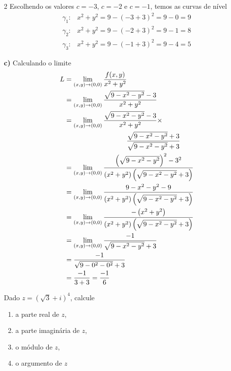 \documentclass[a4paper,12pt,fleqn]{article}
\begin{document}
\begin{answer}
\begin{multicols}{2}
    Escolhendo os valores $c=-3$, $c=-2$ e $c=-1$, temos as curvas de nível
    \begin{align*}
      \gamma_1\colon & x^2 + y^2 = 9 - (-3 + 3)^2 = 9 - 0 = 9 \\
      \gamma_2\colon & x^2 + y^2 = 9 - (-2 + 3)^2 = 9 - 1 = 8 \\
      \gamma_3\colon & x^2 + y^2 = 9 - (-1 + 3)^2 = 9 - 4 = 5
    \end{align*}

    \vspace{\baselineskip}
    \textbf{c)\;}
    Calculando o limite
    \setlength{\jot}{12pt}
    \setlength{\mathindent}{0cm}
    \begin{align*}
      L
      & = \lim_{(x, y)\to(0, 0)} \frac{f(x, y)}{x^2+y^2} \\
      & = \lim_{(x, y)\to(0, 0)} \frac{\sqrt{9-x^2-y^2}-3}{x^2+y^2} \\
      & = \lim_{(x, y)\to(0, 0)} \frac{\sqrt{9-x^2-y^2}-3}{x^2+y^2} \times \\
      & \hspace{32mm}            \frac{\sqrt{9-x^2-y^2}+3}{\sqrt{9-x^2-y^2}+3} \\
      & = \lim_{(x, y)\to(0, 0)} \frac{\left(\sqrt{9-x^2-y^2}\right)^2-3^2}
      {\left(x^2+y^2\right)\left(\sqrt{9-x^2-y^2}+3\right)} \\
      & = \lim_{(x, y)\to(0, 0)} \frac{9-x^2-y^2-9}{\left(x^2+y^2\right)\left(\sqrt{9-x^2-y^2}+3\right)} \\
      & = \lim_{(x, y)\to(0, 0)} \frac{-\left(x^2+y^2\right)}{\left(x^2+y^2\right)\left(\sqrt{9-x^2-y^2}+3\right)}\\
      & = \lim_{(x, y)\to(0, 0)} \frac{-1}{\sqrt{9-x^2-y^2}+3} \\
      & = \frac{-1}{\sqrt{9-0^2-0^2}+3} \\
      & = \frac{-1}{3 + 3} = \frac{-1}{6}
    \end{align*}
  \end{multicols}
\end{answer}

Dado \(z=\left(\sqrt{3}+i\right)^4 \), calcule
\begin{enumerate}[label=\alph*),itemsep=0pt]
  \item a parte real de $z$,
  \item a parte imaginária de $z$,
  \item o módulo de $z$,
  \item o argumento de $z$
\end{enumerate}
\clearpagequestiononly
\end{document}
